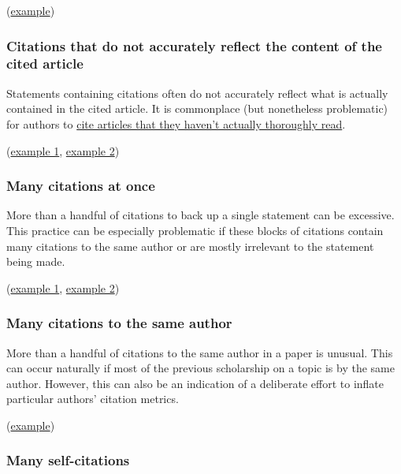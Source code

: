 \documentclass[letterpaper, 12pt]{article}
\begin{document}
(\href{https://pubpeer.com/publications/8A2CF2E1EBFD3ADCD835ADB91DDFE8}{example})

\subsubsection*{Citations that do not accurately reflect the content of the cited article}

Statements containing citations often do not accurately reflect what is actually contained in the cited article. It is commonplace (but nonetheless problematic) for authors to \href{https://ori.hhs.gov/citing-sources-were-not-read-or-thoroughly-understood}{cite articles that they haven't actually thoroughly read}.

(\href{https://pubpeer.com/publications/6E8756FAB18C392065D8313D271090}{example 1}, \href{https://pubpeer.com/publications/D3E493ADF94B3031D24C280F54F37E}{example 2})

\subsubsection*{Many citations at once}

More than a handful of citations to back up a single statement can be excessive. This practice can be especially problematic if these blocks of citations contain many citations to the same author or are mostly irrelevant to the statement being made.

(\href{https://pubpeer.com/publications/D6A50C6DD455715DE626C1CC56B8EB}{example 1}, \href{https://pubpeer.com/publications/11C10949E0FF4EA3C31B6A45F4E22C}{example 2})

\subsubsection*{Many citations to the same author}

More than a handful of citations to the same author in a paper is unusual. This can occur naturally if most of the previous scholarship on a topic is by the same author. However, this can also be an indication of a deliberate effort to inflate particular authors' citation metrics. 

(\href{https://pubpeer.com/publications/0C7C1F371CB05161EEACC303692521}{example})

\subsubsection*{Many self-citations}
\end{document}
